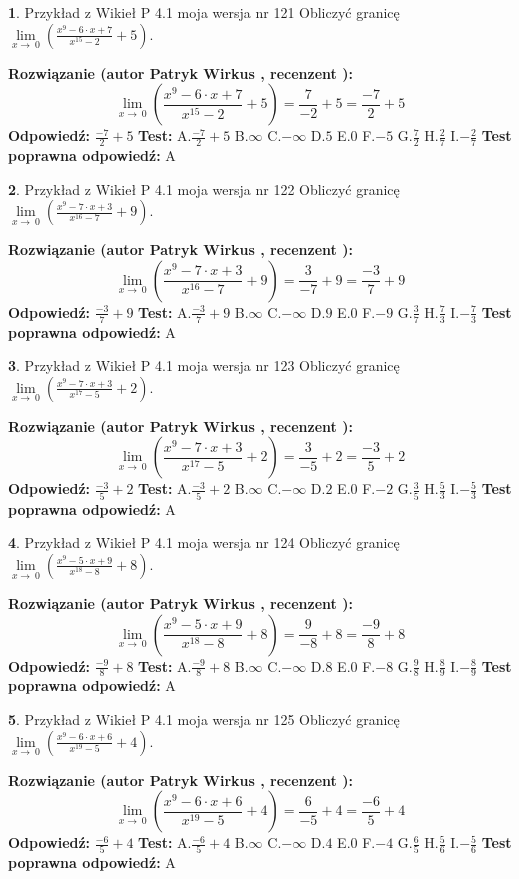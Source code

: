 \documentclass[12pt, a4paper]{article}
\theoremstyle{definition} %
\newtheorem{zad}{}
\newcommand{\zadStart}[1]{\begin{zad}#1\newline}
\newcommand{\zadStop}{\end{zad}}
\newcommand{\rozwStart}[2]{\noindent \textbf{Rozwiązanie (autor #1 , recenzent #2): }\newline}
\newcommand{\rozwStop}{\newline}
\newcommand{\odpStart}{\noindent \textbf{Odpowiedź:}\newline}
\newcommand{\odpStop}{\newline}
\newcommand{\testStart}{\noindent \textbf{Test:}\newline}
\newcommand{\testStop}{\newline}
\newcommand{\kluczStart}{\noindent \textbf{Test poprawna odpowiedź:}\newline}
\newcommand{\kluczStop}{\newline}
\begin{document}
\zadStart{Przykład z Wikieł P 4.1 moja wersja nr 121}
Obliczyć granicę $\lim\limits_{x\to\ 0}(\frac{x^{9}-6 \cdot x +7}{x^{15}-2}+5)$.
\zadStop
\rozwStart{Patryk Wirkus}{}
$$\lim\limits_{x\to\ 0}(\frac{x^{9}-6 \cdot x +7}{x^{15}-2}+5)=\frac{7}{-2}+5=\frac{-7}{2}+5$$
\rozwStop
\odpStart
$\frac{-7}{2}+5$
\odpStop
\testStart
A.$\frac{-7}{2}+5$
B.$\infty$
C.$-\infty$
D.$5$
E.$0$
F.$-5$
G.$\frac{7}{2}$
H.$\frac{2}{7}$
I.$-\frac{2}{7}$
\testStop
\kluczStart
A
\kluczStop



\zadStart{Przykład z Wikieł P 4.1 moja wersja nr 122}
Obliczyć granicę $\lim\limits_{x\to\ 0}(\frac{x^{9}-7 \cdot x +3}{x^{16}-7}+9)$.
\zadStop
\rozwStart{Patryk Wirkus}{}
$$\lim\limits_{x\to\ 0}(\frac{x^{9}-7 \cdot x +3}{x^{16}-7}+9)=\frac{3}{-7}+9=\frac{-3}{7}+9$$
\rozwStop
\odpStart
$\frac{-3}{7}+9$
\odpStop
\testStart
A.$\frac{-3}{7}+9$
B.$\infty$
C.$-\infty$
D.$9$
E.$0$
F.$-9$
G.$\frac{3}{7}$
H.$\frac{7}{3}$
I.$-\frac{7}{3}$
\testStop
\kluczStart
A
\kluczStop



\zadStart{Przykład z Wikieł P 4.1 moja wersja nr 123}
Obliczyć granicę $\lim\limits_{x\to\ 0}(\frac{x^{9}-7 \cdot x +3}{x^{17}-5}+2)$.
\zadStop
\rozwStart{Patryk Wirkus}{}
$$\lim\limits_{x\to\ 0}(\frac{x^{9}-7 \cdot x +3}{x^{17}-5}+2)=\frac{3}{-5}+2=\frac{-3}{5}+2$$
\rozwStop
\odpStart
$\frac{-3}{5}+2$
\odpStop
\testStart
A.$\frac{-3}{5}+2$
B.$\infty$
C.$-\infty$
D.$2$
E.$0$
F.$-2$
G.$\frac{3}{5}$
H.$\frac{5}{3}$
I.$-\frac{5}{3}$
\testStop
\kluczStart
A
\kluczStop



\zadStart{Przykład z Wikieł P 4.1 moja wersja nr 124}
Obliczyć granicę $\lim\limits_{x\to\ 0}(\frac{x^{9}-5 \cdot x +9}{x^{18}-8}+8)$.
\zadStop
\rozwStart{Patryk Wirkus}{}
$$\lim\limits_{x\to\ 0}(\frac{x^{9}-5 \cdot x +9}{x^{18}-8}+8)=\frac{9}{-8}+8=\frac{-9}{8}+8$$
\rozwStop
\odpStart
$\frac{-9}{8}+8$
\odpStop
\testStart
A.$\frac{-9}{8}+8$
B.$\infty$
C.$-\infty$
D.$8$
E.$0$
F.$-8$
G.$\frac{9}{8}$
H.$\frac{8}{9}$
I.$-\frac{8}{9}$
\testStop
\kluczStart
A
\kluczStop



\zadStart{Przykład z Wikieł P 4.1 moja wersja nr 125}
Obliczyć granicę $\lim\limits_{x\to\ 0}(\frac{x^{9}-6 \cdot x +6}{x^{19}-5}+4)$.
\zadStop
\rozwStart{Patryk Wirkus}{}
$$\lim\limits_{x\to\ 0}(\frac{x^{9}-6 \cdot x +6}{x^{19}-5}+4)=\frac{6}{-5}+4=\frac{-6}{5}+4$$
\rozwStop
\odpStart
$\frac{-6}{5}+4$
\odpStop
\testStart
A.$\frac{-6}{5}+4$
B.$\infty$
C.$-\infty$
D.$4$
E.$0$
F.$-4$
G.$\frac{6}{5}$
H.$\frac{5}{6}$
I.$-\frac{5}{6}$
\testStop
\kluczStart
A
\kluczStop
\end{document}
